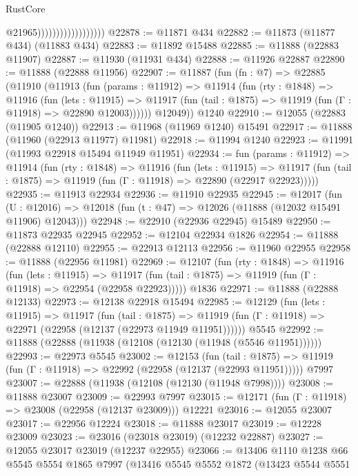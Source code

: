 \begin{lexlean}{RustCore}
\begin{coremodule}
                                        @21965))))))))))))))))))
@22878 := @11871 @434
@22882 := @11873 (@11877 @434) (@11883 @434)
@22883 := @11892 @15488
@22885 := @11888 (@22883 @11907)
@22887 := @11930 (@11931 @434)
@22888 := @11926 @22887
@22890 := @11888 (@22888 @11956)
@22907 := @11887
    (fun (fn : @7) =>
    @22885
      (@11910
        (@11913
          (fun (params : @11912) =>
          @11914
            (fun (rty : @1848) =>
            @11916
              (fun (lets : @11915) =>
              @11917 (fun (tail : @1875) => @11919 (fun (Γ : @11918) => @22890 @12003))))))
        @12049))
    @1240
@22910 := @12055 (@22883 (@11905 @1240))
@22913 := @11968 (@11969 @1240) @15491
@22917 := @11888 (@11960 (@22913 @11977) @11981)
@22918 := @11994 @1240
@22923 := @11991 (@11993 @22918 @15494 @11949 @11951)
@22934 := fun (params : @11912) =>
  @11914
    (fun (rty : @1848) =>
    @11916
      (fun (lets : @11915) =>
      @11917 (fun (tail : @1875) => @11919 (fun (Γ : @11918) => @22890 (@22917 @22923)))))
@22935 := @11913 @22934
@22936 := @11910 @22935
@22945 := @12017
    (fun (U : @12016) => @12018 (fun (t : @47) => @12026 (@11888 (@12032 @15491 @11906) @12043)))
@22948 := @22910 (@22936 @22945) @15489
@22950 := @11873 @22935 @22945
@22952 := @12104 @22934 @1826
@22954 := @11888 (@22888 @12110)
@22955 := @22913 @12113
@22956 := @11960 @22955
@22958 := @11888 (@22956 @11981)
@22969 := @12107
    (fun (rty : @1848) =>
    @11916
      (fun (lets : @11915) =>
      @11917 (fun (tail : @1875) => @11919 (fun (Γ : @11918) => @22954 (@22958 @22923)))))
    @1836
@22971 := @11888 (@22888 @12133)
@22973 := @12138 @22918 @15494
@22985 := @12129
    (fun (lets : @11915) =>
    @11917
      (fun (tail : @1875) =>
      @11919 (fun (Γ : @11918) => @22971 (@22958 (@12137 (@22973 @11949 @11951))))))
    @5545
@22992 := @11888 (@22888 (@11938 (@12108 (@12130 (@11948 (@5546 @11951))))))
@22993 := @22973 @5545
@23002 := @12153
    (fun (tail : @1875) => @11919 (fun (Γ : @11918) => @22992 (@22958 (@12137 (@22993 @11951)))))
    @7997
@23007 := @22888 (@11938 (@12108 (@12130 (@11948 @7998))))
@23008 := @11888 @23007
@23009 := @22993 @7997
@23015 := @12171 (fun (Γ : @11918) => @23008 (@22958 (@12137 @23009))) @12221
@23016 := @12055 @23007
@23017 := @22956 @12224
@23018 := @11888 @23017
@23019 := @12228 @23009
@23023 := @23016 (@23018 @23019) (@12232 @22887)
@23027 := @12055 @23017 @23019 (@12237 @22955)
@23066 := @13406
    @1110
    @1238
    @66
    @5545
    @5554
    @1865
    @7997
    (@13416
      @5545
      @5552
      @1872
      (@13423
        @5544
        @5551

\end{coremodule}
\end{lexlean}
